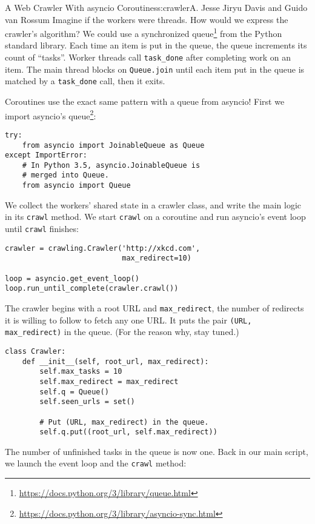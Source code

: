 \begin{aosachapter}{A Web Crawler With asyncio Coroutines}{s:crawler}{A. Jesse Jiryu Davis and Guido van Rossum}
Imagine if the workers were threads. How would we express the crawler's
algorithm? We could use a synchronized queue\footnote{\url{https://docs.python.org/3/library/queue.html}}
from the Python standard library. Each time an item is put in the queue,
the queue increments its count of ``tasks''. Worker threads call
\texttt{task\_done} after completing work on an item. The main thread
blocks on \texttt{Queue.join} until each item put in the queue is
matched by a \texttt{task\_done} call, then it exits.

Coroutines use the exact same pattern with a queue from asyncio! First
we import asyncio's queue\footnote{\url{https://docs.python.org/3/library/asyncio-sync.html}}:

\begin{verbatim}
try:
    from asyncio import JoinableQueue as Queue
except ImportError:
    # In Python 3.5, asyncio.JoinableQueue is
    # merged into Queue.
    from asyncio import Queue
\end{verbatim}

We collect the workers' shared state in a crawler class, and write the
main logic in its \texttt{crawl} method. We start \texttt{crawl} on a
coroutine and run asyncio's event loop until \texttt{crawl} finishes:

\begin{verbatim}
crawler = crawling.Crawler('http://xkcd.com',
                           max_redirect=10)

loop = asyncio.get_event_loop()
loop.run_until_complete(crawler.crawl())
\end{verbatim}

The crawler begins with a root URL and \texttt{max\_redirect}, the
number of redirects it is willing to follow to fetch any one URL. It
puts the pair \texttt{(URL, max\_redirect)} in the queue. (For the
reason why, stay tuned.)

\begin{verbatim}
class Crawler:
    def __init__(self, root_url, max_redirect):
        self.max_tasks = 10
        self.max_redirect = max_redirect
        self.q = Queue()
        self.seen_urls = set()
        
        # Put (URL, max_redirect) in the queue.
        self.q.put((root_url, self.max_redirect))
\end{verbatim}

The number of unfinished tasks in the queue is now one. Back in our main
script, we launch the event loop and the \texttt{crawl} method:


\end{aosachapter}
